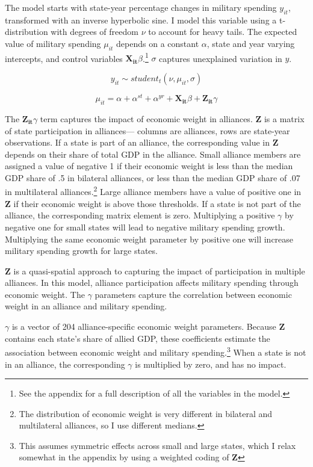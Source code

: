 \documentclass[12pt]{article}
\begin{document}
The model starts with state-year percentage changes in military spending $y_{it}$, transformed with an inverse hyperbolic sine.
I model this variable using a t-distribution with degrees of freedom $\nu$ to account for heavy tails.
The expected value of military spending $\mu_{it}$ depends on a constant $\alpha$, state and year varying intercepts, and control variables $\mathbf{X_{it}} \beta$.\footnote{See the appendix for a full description of all the variables in the model.} 
$\sigma$ captures unexplained variation in $y$. 

\begin{equation}
y_{it} \sim student_t(\nu, \mu_{it}, \sigma) 
\end{equation}

\begin{equation}
\mu_{it} = \alpha + \alpha^{st} + \alpha^{yr} + \mathbf{X_{it}} \beta + \mathbf{Z_{it}} \gamma
\end{equation}


The $\mathbf{Z_{it}} \gamma$ term captures the impact of economic weight in alliances.  
$\textbf{Z}$ is a matrix of state participation in alliances--- columns are alliances, rows are state-year observations.  
If a state is part of an alliance, the corresponding value in $\textbf{Z}$ depends on their share of total GDP in the alliance. 
Small alliance members are assigned a value of negative 1 if their economic weight is less than the median GDP share of .5 in bilateral alliances, or less than the median GDP share of .07 in multilateral alliances.\footnote{The distribution of economic weight is very different in bilateral and multilateral alliances, so I use different medians.}
Large alliance members have a value of positive one in $\textbf{Z}$ if their economic weight is above those thresholds. 
If a state is not part of the alliance, the corresponding matrix element is zero. 
Multiplying a positive $\gamma$ by negative one for small states will lead to negative military spending growth.
Multiplying the same economic weight parameter by positive one will increase military spending growth for large states. 


$\textbf{Z}$ is a quasi-spatial approach to capturing the impact of participation in multiple alliances.
In this model, alliance participation affects military spending through economic weight.  
The $\gamma$ parameters capture the correlation between economic weight in an alliance and military spending. 


$\gamma$ is a vector of 204 alliance-specific economic weight parameters.  
Because \textbf{Z} contains each state's share of allied GDP, these coefficients estimate the association between economic weight and military spending.\footnote{This assumes symmetric effects across small and large states, which I relax somewhat in the appendix by using a weighted coding of $\textbf{Z}$} 
When a state is not in an alliance, the corresponding $\gamma$ is multiplied by zero, and has no impact. 
\end{document}
